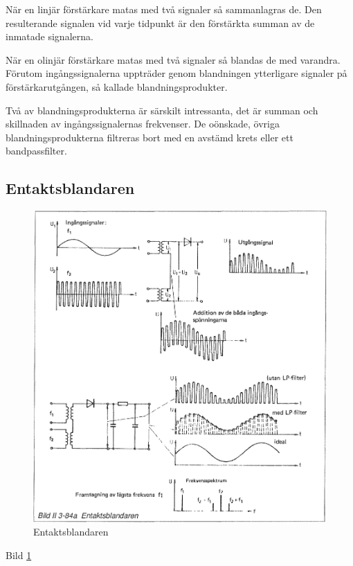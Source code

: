 När en linjär förstärkare matas med två signaler så sammanlagras
de. Den resulterande signalen vid varje tidpunkt är den förstärkta
summan av de inmatade signalerna.

När en olinjär förstärkare matas med två signaler så blandas de med
varandra. Förutom ingångssignalerna uppträder genom blandningen
ytterligare signaler på förstärkarutgången, så kallade
blandningsprodukter.

Två av blandningsprodukterna är särskilt intressanta, det är summan
och skillnaden av ingångssignalernas frekvenser. De oönskade, övriga
blandningsprodukterna filtreras bort med en avstämd krets eller ett
bandpassfilter.

\subsection{Entaktsblandaren}

\begin{figure}
\includegraphics[width=\textwidth]{images/bild_2_3-84a}
\caption{Entaktsblandaren}
\label{fig:BildII3-84a}
\end{figure}

Bild \ref{fig:BildII3-84a}

